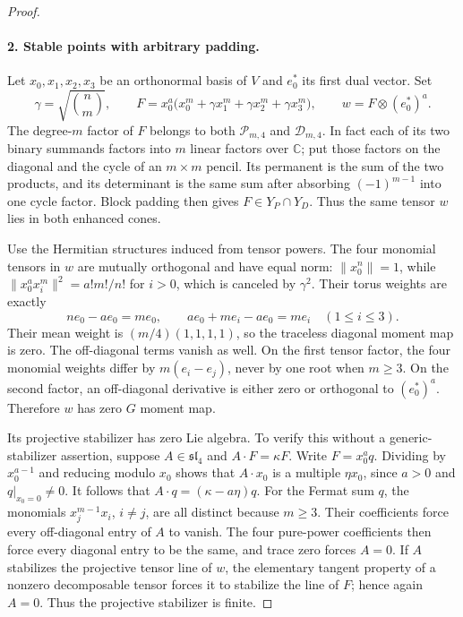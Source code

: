 \begin{proof}
\paragraph{2. Stable points with arbitrary padding.}
Let $x_0,x_1,x_2,x_3$ be an orthonormal basis of $V$ and
$e_0^*$ its first dual vector. Set
\[
 \gamma=\sqrt{\binom{n}{m}},\qquad
 F=x_0^a\bigl(x_0^m+\gamma x_1^m+
                         \gamma x_2^m+\gamma x_3^m\bigr),
 \qquad w=F\otimes(e_0^*)^a.
\]
The degree-$m$ factor of $F$ belongs to both
$\mathcal P_{m,4}$ and $\mathcal D_{m,4}$. In fact each of its two
binary summands factors into $m$ linear factors over $\mathbb C$;
put those factors on the diagonal and the cycle of an $m\times m$
pencil. Its permanent is the sum of the two products, and its
determinant is the same sum after absorbing $(-1)^{m-1}$ into one
cycle factor. Block padding then gives $F\in Y_P\cap Y_D$.
Thus the same tensor $w$ lies in both enhanced cones.

Use the Hermitian structures induced from tensor powers. The four
monomial tensors in $w$ are mutually orthogonal and have equal norm:
$\|x_0^n\|=1$, while
$\|x_0^a x_i^m\|^2=a!m!/n!$ for $i>0$, which is canceled by
$\gamma^2$. Their torus weights are exactly
\[
 ne_0-ae_0=me_0,\qquad
 ae_0+me_i-ae_0=me_i\quad(1\leq i\leq3).
\]
Their mean weight is $(m/4)(1,1,1,1)$, so the traceless diagonal
moment map is zero. The off-diagonal terms vanish as well. On the
first tensor factor, the four monomial weights differ by
$m(e_i-e_j)$, never by one root when $m\geq3$. On the second
factor, an off-diagonal derivative is either zero or orthogonal
to $(e_0^*)^a$. Therefore $w$ has zero $G$ moment map.

Its projective stabilizer has zero Lie algebra. To verify this
without a generic-stabilizer assertion, suppose
$A\in\mathfrak{sl}_4$ and $A\cdot F=\kappa F$.
Write $F=x_0^a q$. Dividing by $x_0^{a-1}$ and reducing modulo
$x_0$ shows that $A\cdot x_0$ is a multiple $\eta x_0$, since
$a>0$ and $q|_{x_0=0}\ne0$. It follows that
$A\cdot q=(\kappa-a\eta)q$.
For the Fermat sum $q$, the monomials $x_j^{m-1}x_i$, $i\ne j$,
are all distinct because $m\geq3$. Their coefficients force every
off-diagonal entry of $A$ to vanish. The four pure-power coefficients
then force every diagonal entry to be the same, and trace zero
forces $A=0$. If $A$ stabilizes the projective tensor line of $w$,
the elementary tangent property of a nonzero decomposable tensor
forces it to stabilize the line of $F$; hence again $A=0$.
Thus the projective stabilizer is finite.


\end{proof}
